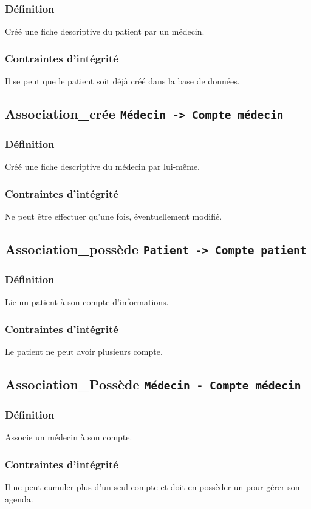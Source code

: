 \documentclass[a4paper, 11pt]{report}
\begin{document}
\subsubsection{Définition}
Créé une fiche descriptive du patient par un médecin.
\subsubsection{Contraintes d'intégrité}
Il se peut que le patient soit déjà créé dans la base de données.

\subsection{Association\_crée \texttt{Médecin -> Compte médecin}}
\subsubsection{Définition}
Créé une fiche descriptive du médecin par lui-même.
\subsubsection{Contraintes d'intégrité}
Ne peut être effectuer qu'une fois, éventuellement modifié.

\subsection{Association\_possède \texttt{Patient -> Compte patient}}
\subsubsection{Définition}
Lie un patient à son compte d'informations.
\subsubsection{Contraintes d'intégrité}
Le patient ne peut avoir plusieurs compte.

\subsection{Association\_Possède \texttt{Médecin - Compte médecin}}
\subsubsection{Définition}
Associe un médecin à son compte.
\subsubsection{Contraintes d'intégrité}
Il ne peut cumuler plus d'un seul compte et doit en possèder un pour gérer son
agenda.
\end{document}

